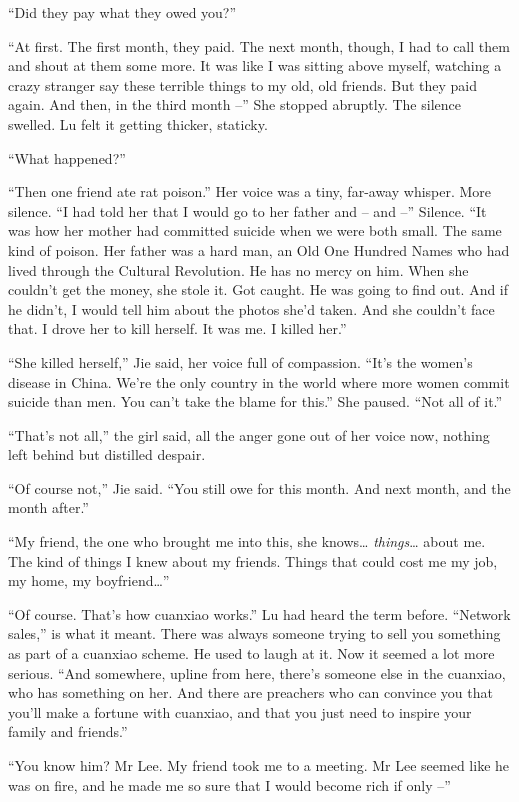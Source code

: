 ``Did they pay what they owed you?''

``At first. The first month, they paid. The next month, though, I
had to call them and shout at them some more. It was like I was
sitting above myself, watching a crazy stranger say these terrible
things to my old, old friends. But they paid again. And then, in
the third month --'' She stopped abruptly. The silence swelled. Lu
felt it getting thicker, staticky.

``What happened?''

``Then one friend ate rat poison.'' Her voice was a tiny, far-away
whisper. More silence. ``I had told her that I would go to her
father and -- and --'' Silence. ``It was how her mother had committed
suicide when we were both small. The same kind of poison. Her
father was a hard man, an Old One Hundred Names who had lived
through the Cultural Revolution. He has no mercy on him. When she
couldn't get the money, she stole it. Got caught. He was going to
find out. And if he didn't, I would tell him about the photos she'd
taken. And she couldn't face that. I drove her to kill herself. It
was me. I killed her.''

``She killed herself,'' Jie said, her voice full of compassion. ``It's
the women's disease in China. We're the only country in the world
where more women commit suicide than men. You can't take the blame
for this.'' She paused. ``Not all of it.''

``That's not all,'' the girl said, all the anger gone out of her
voice now, nothing left behind but distilled despair.

``Of course not,'' Jie said. ``You still owe for this month. And next
month, and the month after.''

``My friend, the one who brought me into this, she knows\ldots{}
\emph{things}\ldots{} about me. The kind of things I knew about my
friends. Things that could cost me my job, my home, my
boyfriend\ldots{}''

``Of course. That's how cuanxiao works.'' Lu had heard the term
before. ``Network sales,'' is what it meant. There was always someone
trying to sell you something as part of a cuanxiao scheme. He used
to laugh at it. Now it seemed a lot more serious. ``And somewhere,
upline from here, there's someone else in the cuanxiao, who has
something on her. And there are preachers who can convince you that
you'll make a fortune with cuanxiao, and that you just need to
inspire your family and friends.''

``You know him? Mr Lee. My friend took me to a meeting. Mr Lee
seemed like he was on fire, and he made me so sure that I would
become rich if only --''

